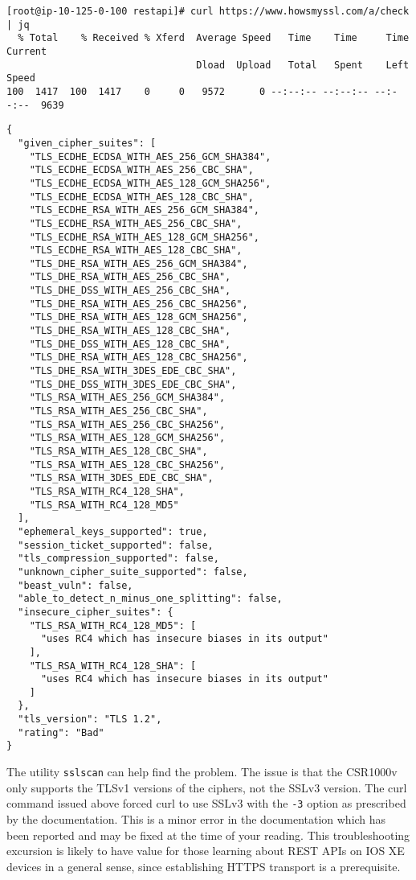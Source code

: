 \begin{verbatim}
[root@ip-10-125-0-100 restapi]# curl https://www.howsmyssl.com/a/check | jq
  % Total    % Received % Xferd  Average Speed   Time    Time     Time  Current
                                 Dload  Upload   Total   Spent    Left  Speed
100  1417  100  1417    0     0   9572      0 --:--:-- --:--:-- --:--:--  9639
\end{verbatim}
\begin{verbatim}
{
  "given_cipher_suites": [
    "TLS_ECDHE_ECDSA_WITH_AES_256_GCM_SHA384",
    "TLS_ECDHE_ECDSA_WITH_AES_256_CBC_SHA",
    "TLS_ECDHE_ECDSA_WITH_AES_128_GCM_SHA256",
    "TLS_ECDHE_ECDSA_WITH_AES_128_CBC_SHA",
    "TLS_ECDHE_RSA_WITH_AES_256_GCM_SHA384",
    "TLS_ECDHE_RSA_WITH_AES_256_CBC_SHA",
    "TLS_ECDHE_RSA_WITH_AES_128_GCM_SHA256",
    "TLS_ECDHE_RSA_WITH_AES_128_CBC_SHA",
    "TLS_DHE_RSA_WITH_AES_256_GCM_SHA384",
    "TLS_DHE_RSA_WITH_AES_256_CBC_SHA",
    "TLS_DHE_DSS_WITH_AES_256_CBC_SHA",
    "TLS_DHE_RSA_WITH_AES_256_CBC_SHA256",
    "TLS_DHE_RSA_WITH_AES_128_GCM_SHA256",
    "TLS_DHE_RSA_WITH_AES_128_CBC_SHA",
    "TLS_DHE_DSS_WITH_AES_128_CBC_SHA",
    "TLS_DHE_RSA_WITH_AES_128_CBC_SHA256",
    "TLS_DHE_RSA_WITH_3DES_EDE_CBC_SHA",
    "TLS_DHE_DSS_WITH_3DES_EDE_CBC_SHA",
    "TLS_RSA_WITH_AES_256_GCM_SHA384",
    "TLS_RSA_WITH_AES_256_CBC_SHA",
    "TLS_RSA_WITH_AES_256_CBC_SHA256",
    "TLS_RSA_WITH_AES_128_GCM_SHA256",
    "TLS_RSA_WITH_AES_128_CBC_SHA",
    "TLS_RSA_WITH_AES_128_CBC_SHA256",
    "TLS_RSA_WITH_3DES_EDE_CBC_SHA",
    "TLS_RSA_WITH_RC4_128_SHA",
    "TLS_RSA_WITH_RC4_128_MD5"
  ],
  "ephemeral_keys_supported": true,
  "session_ticket_supported": false,
  "tls_compression_supported": false,
  "unknown_cipher_suite_supported": false,
  "beast_vuln": false,
  "able_to_detect_n_minus_one_splitting": false,
  "insecure_cipher_suites": {
    "TLS_RSA_WITH_RC4_128_MD5": [
      "uses RC4 which has insecure biases in its output"
    ],
    "TLS_RSA_WITH_RC4_128_SHA": [
      "uses RC4 which has insecure biases in its output"
    ]
  },
  "tls_version": "TLS 1.2",
  "rating": "Bad"
}
\end{verbatim}

The utility \verb|sslscan| can help find the problem. The issue is that the
CSR1000v only supports the TLSv1 versions of the ciphers, not the SSLv3
version. The curl command issued above forced curl to use SSLv3 with the
\verb|-3| option as prescribed by the documentation. This is a minor error in
the documentation which has been reported and may be fixed at the time of your
reading. This troubleshooting excursion is likely to have value for those
learning about REST APIs on IOS XE devices in a general sense, since
establishing HTTPS transport is a prerequisite. 

